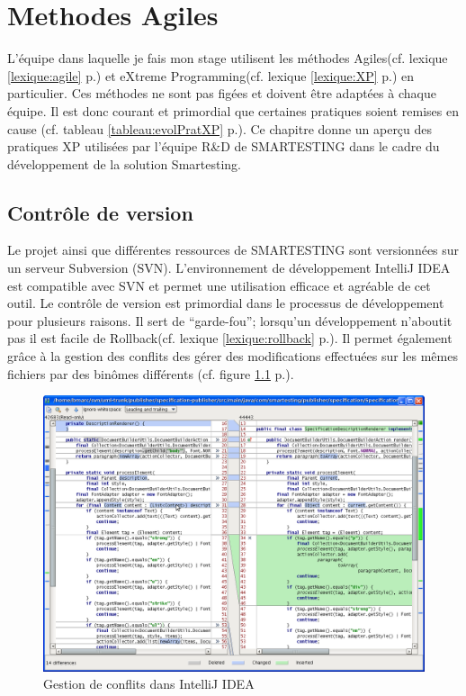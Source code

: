 \chapter{Methodes Agiles}\label{agile}
L'équipe dans laquelle je fais mon stage utilisent les méthodes Agiles(cf. lexique \ref{lexique:agile} p.\pageref{lexique:agile}) et eXtreme Programming(cf. lexique \ref{lexique:XP} p.\pageref{lexique:XP}) en particulier. Ces méthodes ne sont pas figées et doivent être adaptées à chaque équipe. Il est donc courant et primordial que certaines pratiques soient remises en cause (cf. tableau \ref{tableau:evolPratXP} p.\pageref{tableau:evolPratXP}). Ce chapitre donne un aperçu des pratiques XP utilisées par l'équipe R\&D de SMARTESTING dans le cadre du développement de la solution Smartesting.


\section{Contrôle de version}
Le projet ainsi que différentes ressources de SMARTESTING sont versionnées sur un serveur Subversion (SVN). L'environnement de développement IntelliJ IDEA est compatible avec SVN et permet une utilisation efficace et agréable de cet outil. Le contrôle de version est primordial dans le processus de développement pour plusieurs raisons. Il sert de ``garde-fou''; lorsqu'un développement n'aboutit pas il est facile de Rollback(cf. lexique \ref{lexique:rollback} p.\pageref{lexique:rollback}). Il permet également grâce à la gestion des conflits des gérer des modifications effectuées sur les mêmes fichiers par des binômes différents (cf. figure \ref{figure:ideaMerge} p.\pageref{figure:ideaMerge}). 

\begin{figure}[!h]
\centering
\includegraphics[width=\textwidth]{Illustrations/ideaMerge.png}
\caption{Gestion de conflits dans IntelliJ IDEA}
\label{figure:ideaMerge}
\end{figure}



